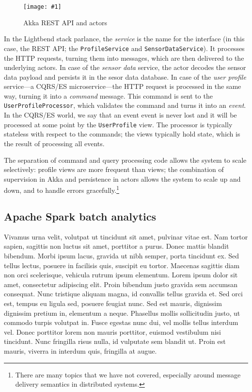 \documentclass[a4paper, 10 pt, conference]{IEEEtran}
\def\lstinlinex{\lstinline[basicstyle=\itshape,keywordstyle={}]}
\newcommand{\fig}[3]{
  \begin{figure}[h]
    \begin{center}
        \caption{#3}
        \texttt{[image: \#1]}
        \label{fig:#2}
    \end{center}
  \end{figure}
}
\begin{document}
\fig{ri-akka-actors.png}{ri-akka-actors}{Akka REST API and actors}

In the Lightbend stack parlance, the \emph{service} is the name for the interface (in this case, the REST API; the \lstinlinex{ProfileService} and \lstinlinex{SensorDataService}). It processes the HTTP requests, turning them into messages, which are then delivered to the underlying actors. In case of the \emph{sensor data} service, the actor decodes the sensor data payload and persists it in the sesor data database. In case of the \emph{user profile} service---a CQRS/ES microservice---the HTTP request is processed in the same way, turning it into a \emph{command} message. This command is sent to the \lstinlinex{UserProfileProcessor}, which validates the command and turns it into an \emph{event}. In the CQRS/ES world, we say that an event event is never lost and it will be processed at some point by the \lstinlinex{UserProfile} view. The processor is typically stateless with respect to the commands; the views typically hold state, which is the result of processing all events.

The separation of command and query processing code allows the system to scale selectively: profile views are more frequent than views; the combination of supervision in Akka and persistence in actors allows the system to scale up and down, and to handle errors gracefully.\footnote{There are many topics that we have not covered, especially around message delivery semantics in distributed systems.}

\subsection{Apache Spark batch analytics}

Vivamus urna velit, volutpat ut tincidunt sit amet, pulvinar vitae est. Nam tortor sapien, sagittis non luctus sit amet, porttitor a purus. Donec mattis blandit bibendum. Morbi ipsum lacus, gravida ut nibh semper, porta tincidunt ex. Sed tellus lectus, posuere in facilisis quis, suscipit eu tortor. Maecenas sagittis diam non orci scelerisque, vehicula rutrum ipsum elementum. Lorem ipsum dolor sit amet, consectetur adipiscing elit. Proin bibendum justo gravida sem accumsan consequat. Nunc tristique aliquam magna, id convallis tellus gravida et. Sed orci est, tempus eu ligula sed, posuere feugiat nunc. Sed est mauris, dignissim dignissim pretium in, elementum a neque. Phasellus mollis sollicitudin justo, ut commodo turpis volutpat in. Fusce egestas nunc dui, vel mollis tellus interdum vel. Donec porttitor lorem non mauris porttitor, euismod vestibulum nisi tincidunt. Nunc fringilla risus nulla, id vulputate sem blandit ut. Proin est mauris, viverra in interdum quis, fringilla at augue.
\end{document}
